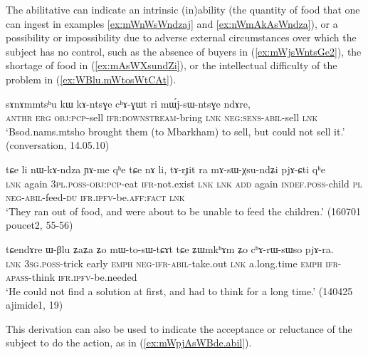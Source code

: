 The abilitative can indicate an intrinsic (in)ability (the quantity of food that one can ingest in examples \ref{ex:mWnWsWndzaj} and \ref{ex:nWmAkAsWndza}), or a possibility or impossibility due to adverse external circumstances over which the subject has no control, such as the absence of buyers in (\ref{ex:mWjsWntsGe2}), the shortage of food in (\ref{ex:mAsWXsundZi}), or the intellectual difficulty of the problem in (\ref{ex:WBlu.mWtosWtCAt}).

 \begin{exe}
\ex \label{ex:mWjsWntsGe2}
 \gll   sɤnɤmmtsʰu kɯ kɤ-ntsɣe cʰɤ-ɣɯt ri mɯ́j-sɯ-ntsɣe ndɤre, \\
  \textsc{anthr} \textsc{erg} \textsc{obj}:\textsc{pcp}-sell \textsc{ifr}:\textsc{downstream}-bring \textsc{lnk} \textsc{neg}:\textsc{sens}-\textsc{abil}-sell \textsc{lnk} \\
\glt `Bsod.nams.mtsho brought them (to Mbarkham) to sell, but could not sell it.' (conversation, 14.05.10)
 \end{exe}
 
  \begin{exe}
\ex \label{ex:mAsWXsundZi}
 \gll   tɕe li nɯ-kɤ-ndza ɲɤ-me qʰe tɕe nɤ li, tɤ-rɟit ra mɤ-sɯ-χsu-ndʑi pjɤ-ɕti qʰe \\
 \textsc{lnk} again \textsc{3pl}.\textsc{poss}-\textsc{obj}:\textsc{pcp}-eat \textsc{ifr}-not.exist \textsc{lnk} \textsc{lnk} \textsc{add} again \textsc{indef}.\textsc{poss}-child \textsc{pl} \textsc{neg}-\textsc{abil}-feed-\textsc{du} \textsc{ifr}.\textsc{ipfv}-be.\textsc{aff}:\textsc{fact} \textsc{lnk} \\
\glt `They ran out of food, and were about to be unable to feed the children.' (160701 poucet2, 55-56)
  \end{exe}
  

 \begin{exe}
\ex \label{ex:WBlu.mWtosWtCAt}
 \gll   tɕendɤre ɯ-βlu ʑaʑa ʑo mɯ-to-sɯ-tɕɤt tɕe ʑɯmkʰɤm ʑo cʰɤ-rɯ-sɯso pjɤ-ra. \\
\textsc{lnk}  \textsc{3sg}.\textsc{poss}-trick early \textsc{emph} \textsc{neg}-\textsc{ifr}-\textsc{abil}-take.out \textsc{lnk} a.long.time \textsc{emph} \textsc{ifr}-\textsc{apass}-think \textsc{ifr}.\textsc{ipfv}-be.needed \\
\glt `He could not find a solution at first, and had to think for a long time.' (140425 ajimide1, 19)
 \end{exe}
 
 This derivation can also be used to indicate the acceptance or reluctance of the subject to do the action, as in (\ref{ex:mWpjAsWBde.abil}). 
 
